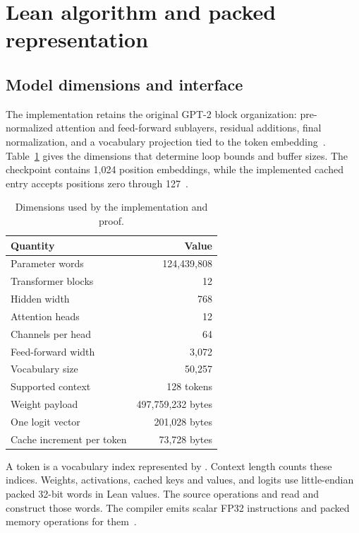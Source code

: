 \section{Lean algorithm and packed representation}
\label{sec:algorithm}

\subsection{Model dimensions and interface}

The implementation retains the original GPT-2 block organization: pre-normalized attention and feed-forward sublayers, residual additions, final normalization, and a vocabulary projection tied to the token embedding~\cite{gpt2}.  Table~\ref{tab:shape} gives the dimensions that determine loop bounds and buffer sizes.  The checkpoint contains 1,024 position embeddings, while the implemented cached entry accepts positions zero through 127~\cite{manifest,cached}.

\begin{table}[ht]
\centering
\begin{tabular}{lr}
\toprule
Quantity & Value\\
\midrule
Parameter words & 124,439,808\\
Transformer blocks & 12\\
Hidden width & 768\\
Attention heads & 12\\
Channels per head & 64\\
Feed-forward width & 3,072\\
Vocabulary size & 50,257\\
Supported context & 128 tokens\\
Weight payload & 497,759,232 bytes\\
One logit vector & 201,028 bytes\\
Cache increment per token & 73,728 bytes\\
\bottomrule
\end{tabular}
\caption{Dimensions used by the implementation and proof.}
\label{tab:shape}
\end{table}

A token is a vocabulary index represented by .  Context length counts these indices.  Weights, activations, cached keys and values, and logits use little-endian packed 32-bit words in Lean  values.  The source operations  and  read and construct those words.  The compiler emits scalar FP32 instructions and packed memory operations for them~\cite{kernels,packed}.

